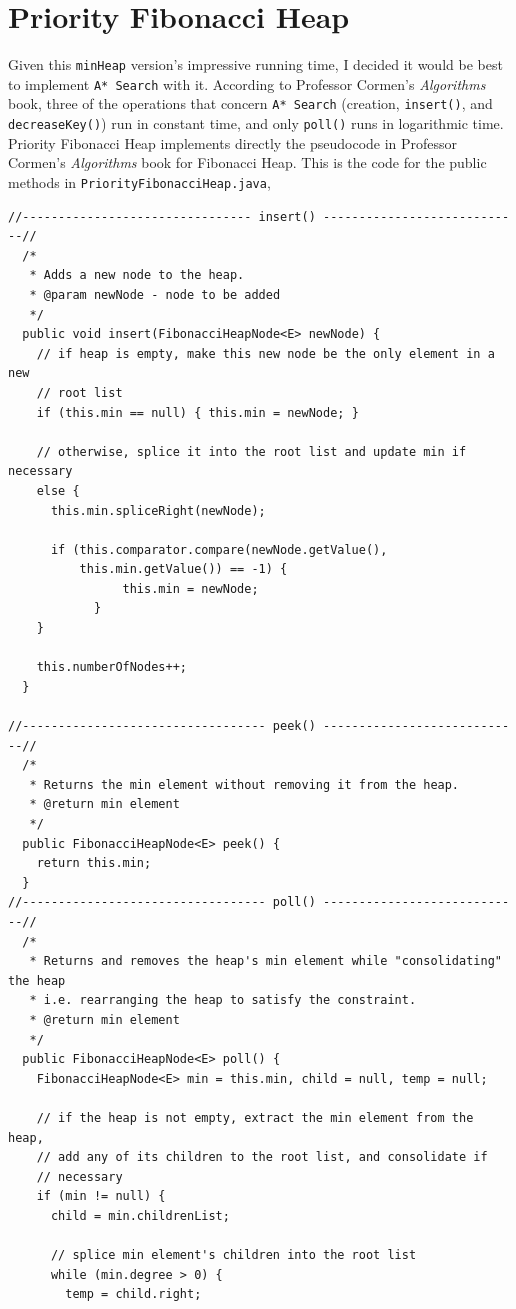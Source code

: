 \documentclass{article}
\begin{document}
\section{Priority Fibonacci Heap}
Given this \verb`minHeap` version's impressive running time, I decided it would be best to implement \verb`A* Search` with it. According to Professor Cormen's {\it Algorithms} book, three of the operations that concern \verb`A* Search` (creation, \verb`insert()`, and \verb`decreaseKey()`) run in constant time, and only \verb`poll()` runs in logarithmic time. Priority Fibonacci Heap implements directly the pseudocode in Professor Cormen's {\it Algorithms} book for Fibonacci Heap. This is the code for the public methods in \verb`PriorityFibonacciHeap.java`,\\
\begin{lstlisting}
//-------------------------------- insert() ----------------------------//
  /*
   * Adds a new node to the heap.
   * @param newNode - node to be added 
   */
  public void insert(FibonacciHeapNode<E> newNode) {
    // if heap is empty, make this new node be the only element in a new
    // root list
    if (this.min == null) { this.min = newNode; }
    
    // otherwise, splice it into the root list and update min if necessary 
    else {
      this.min.spliceRight(newNode);
      
      if (this.comparator.compare(newNode.getValue(),
          this.min.getValue()) == -1) {
                this.min = newNode;
            }
    }
    
    this.numberOfNodes++; 
  }

//---------------------------------- peek() ----------------------------//
  /*
   * Returns the min element without removing it from the heap.
   * @return min element 
   */
  public FibonacciHeapNode<E> peek() {
    return this.min;
  }
//---------------------------------- poll() ----------------------------//  
  /*
   * Returns and removes the heap's min element while "consolidating" the heap
   * i.e. rearranging the heap to satisfy the constraint. 
   * @return min element
   */
  public FibonacciHeapNode<E> poll() {
    FibonacciHeapNode<E> min = this.min, child = null, temp = null;
    
    // if the heap is not empty, extract the min element from the heap,
    // add any of its children to the root list, and consolidate if
    // necessary
    if (min != null) {
      child = min.childrenList;
      
      // splice min element's children into the root list
      while (min.degree > 0) {
        temp = child.right;
        

\end{lstlisting}
\end{document}
